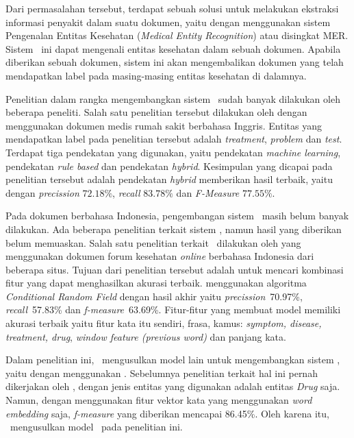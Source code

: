 	Dari permasalahan tersebut, terdapat sebuah solusi untuk melakukan ekstraksi informasi penyakit dalam suatu dokumen, yaitu dengan menggunakan sistem Pengenalan Entitas Kesehatan (\textit{Medical Entity Recognition}) atau disingkat MER. Sistem \mer~ini dapat mengenali entitas kesehatan dalam sebuah dokumen. Apabila diberikan sebuah dokumen, sistem ini akan mengembalikan dokumen yang telah mendapatkan label pada masing-masing entitas kesehatan di dalamnya.
	
	Penelitian dalam rangka mengembangkan sistem \mer~sudah banyak dilakukan oleh beberapa peneliti. Salah satu penelitian tersebut dilakukan oleh \cite{abacha2011medical} dengan menggunakan dokumen medis rumah sakit berbahasa Inggris. Entitas yang mendapatkan label pada penelitian tersebut adalah \textit{treatment}, \textit{problem} dan \textit{test}. Terdapat tiga pendekatan yang digunakan, yaitu pendekatan \textit{machine learning}, pendekatan \textit{rule based} dan pendekatan \textit{hybrid}. Kesimpulan yang dicapai pada penelitian tersebut adalah pendekatan \textit{hybrid} memberikan hasil terbaik, yaitu dengan \textit{precission} $ 72.18\% $, \textit{recall} $ 83.78\% $ dan \textit{F-Measure} $ 77.55\% $.
		
	Pada dokumen berbahasa Indonesia, pengembangan sistem \mer~masih belum banyak dilakukan. Ada beberapa penelitian terkait sistem \mer, namun hasil yang diberikan belum memuaskan. Salah satu penelitian terkait \mer~dilakukan oleh \cite{skripsiKakRadit} yang menggunakan dokumen forum kesehatan \textit{online} berbahasa Indonesia dari beberapa situs. Tujuan dari penelitian tersebut adalah untuk mencari kombinasi fitur yang dapat menghasilkan akurasi terbaik. \cite{skripsiKakRadit} menggunakan algoritma \textit{Conditional Random Field} dengan hasil akhir yaitu \textit{precission}~70.97\%, \textit{recall}~57.83\% dan \textit{f-measure}~63.69\%. Fitur-fitur yang membuat model memiliki akurasi terbaik yaitu fitur kata itu sendiri, frasa, kamus: \textit{symptom, disease, treatment, drug}, \textit{window feature (previous word)} dan panjang kata.

	Dalam penelitian ini, \saya~mengusulkan model lain untuk mengembangkan sistem \mer, yaitu dengan menggunakan \rnn. Sebelumnya penelitian terkait hal ini pernah dikerjakan oleh \cite{mujiono2016new}, dengan jenis entitas yang digunakan adalah entitas \textit{Drug} saja. Namun, dengan menggunakan fitur vektor kata yang menggunakan \textit{word embedding} saja, \textit{f-measure} yang diberikan mencapai 86.45\%. Oleh karena itu, \saya~mengusulkan model \rnn~pada penelitian ini.
		
